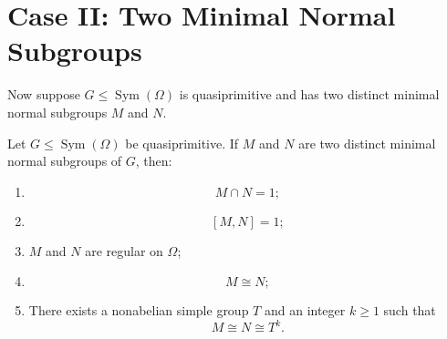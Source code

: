 \section{Case II: Two Minimal Normal Subgroups}

Now suppose \(G\leq \operatorname{Sym}(\Omega)\) is quasiprimitive and has two distinct
minimal normal subgroups \(M\) and \(N\).

\begin{proposition}
Let \(G\leq \operatorname{Sym}(\Omega)\) be quasiprimitive. If \(M\) and \(N\) are two distinct
minimal normal subgroups of \(G\), then:

\begin{enumerate}[label=(\arabic*)]
    \item
    \[
        M\cap N=1;
    \]

    \item
    \[
        [M,N]=1;
    \]

    \item \(M\) and \(N\) are regular on \(\Omega\);

    \item
    \[
        M\cong N;
    \]

    \item There exists a nonabelian simple group \(T\) and an integer \(k\geq 1\) such that
    \[
        M\cong N\cong T^k.
    \]
\end{enumerate}
\end{proposition}

